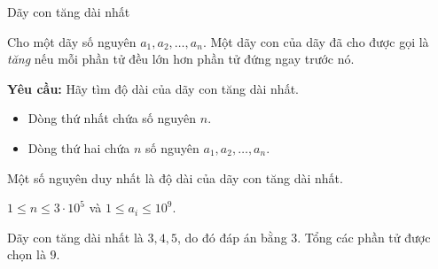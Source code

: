 \begin{problem}[
  input = stdin, output = stdout,
  time = 1, memory = 256, points = 100,
  origin = {VOI 2026},
]{Dãy con tăng dài nhất}

Cho một dãy số nguyên $a_1, a_2, \dots, a_n$. Một dãy con của dãy đã cho được
gọi là \emph{tăng} nếu mỗi phần tử đều lớn hơn phần tử đứng ngay trước nó.

\textbf{Yêu cầu:} Hãy tìm độ dài của dãy con tăng dài nhất.

\InputFile
\begin{itemize}
  \item Dòng thứ nhất chứa số nguyên $n$.
  \item Dòng thứ hai chứa $n$ số nguyên $a_1, a_2, \dots, a_n$.
\end{itemize}

\OutputFile
Một số nguyên duy nhất là độ dài của dãy con tăng dài nhất.

\Constraints
$1 \le n \le 3 \cdot 10^5$ và $1 \le a_i \le 10^9$.

\begin{subtasks}
\end{subtasks}

\Examples
\begin{example}
%
%
%
\end{example}

\Note
Dãy con tăng dài nhất là $3, 4, 5$, do đó đáp án bằng $3$. Tổng các phần tử
được chọn là $9$.
\end{problem}
